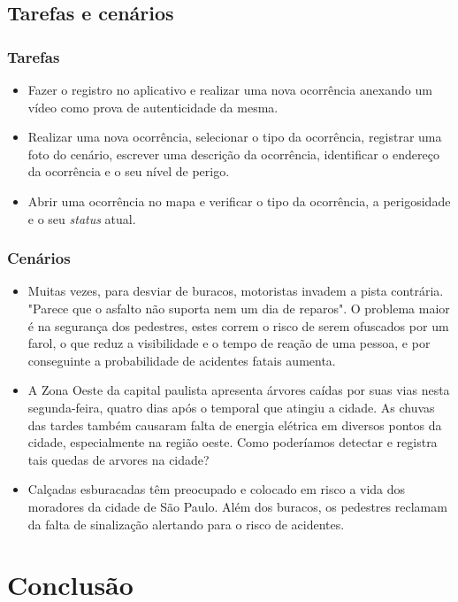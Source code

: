 \documentclass[a4paper,12pt,twoside]{report}
\begin{document}
\section{Tarefas e cenários}
\subsection{Tarefas}
\begin{itemize}
\item Fazer o registro no aplicativo e realizar uma nova ocorrência anexando um vídeo como prova de autenticidade da mesma.
\item Realizar uma nova ocorrência, selecionar o tipo da ocorrência, registrar uma foto do cenário, escrever uma descrição da ocorrência, identificar o endereço da ocorrência e o seu nível de perigo.
\item Abrir uma ocorrência no mapa e verificar o tipo da ocorrência, a perigosidade e o seu \textit{status} atual.
\end{itemize}
\subsection{Cenários}
\begin{itemize}
\item Muitas vezes, para desviar de buracos, motoristas invadem a pista contrária. "Parece que o asfalto não suporta nem um dia de reparos". O problema maior é na segurança dos pedestres, estes correm o risco de serem ofuscados por um farol, o que reduz a visibilidade e o tempo de reação de uma pessoa, e por conseguinte a probabilidade de acidentes fatais aumenta. 
\item A Zona Oeste da capital paulista apresenta árvores caídas por suas vias nesta segunda-feira, quatro dias após o temporal que atingiu a cidade. As chuvas das tardes também causaram falta de energia elétrica em diversos pontos da cidade, especialmente na região oeste. Como poderíamos detectar e registra tais quedas de arvores na cidade?
\item Calçadas esburacadas têm preocupado e colocado em risco a vida dos moradores da cidade de São Paulo. Além dos buracos, os pedestres reclamam da falta de sinalização alertando para o risco de acidentes.
\end{itemize}

\chapter{Conclusão}
\end{document}
